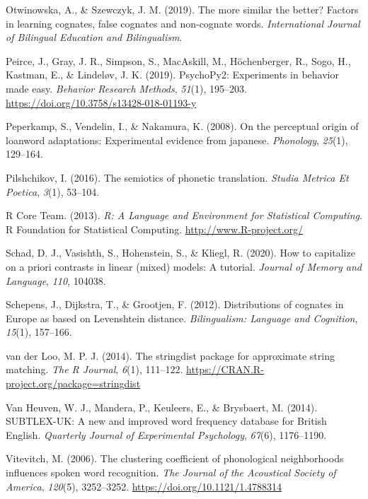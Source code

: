 \documentclass[
]{article}
\newlength{\cslhangindent}
\newenvironment{CSLReferences}[2] %
 {\begin{list}{}{%
  \setlength{\itemindent}{0pt}
  \setlength{\leftmargin}{0pt}
  \setlength{\parsep}{0pt}
  \ifodd #1
   \setlength{\leftmargin}{\cslhangindent}
   \setlength{\itemindent}{-1\cslhangindent}
  \fi
  \setlength{\itemsep}{#2\baselineskip}}}
 {\end{list}}
\begin{document}
\begin{CSLReferences}{1}{0}
Otwinowska, A., \& Szewczyk, J. M. (2019). The more similar the better?
Factors in learning cognates, false cognates and non-cognate words.
\emph{International Journal of Bilingual Education and Bilingualism}.

Peirce, J., Gray, J. R., Simpson, S., MacAskill, M., Höchenberger, R.,
Sogo, H., Kastman, E., \& Lindeløv, J. K. (2019). {PsychoPy2}:
{Experiments} in behavior made easy. \emph{Behavior Research Methods},
\emph{51}(1), 195--203. \url{https://doi.org/10.3758/s13428-018-01193-y}

Peperkamp, S., Vendelin, I., \& Nakamura, K. (2008). On the perceptual
origin of loanword adaptations: Experimental evidence from japanese.
\emph{Phonology}, \emph{25}(1), 129--164.

Pilshchikov, I. (2016). The semiotics of phonetic translation.
\emph{Studia Metrica Et Poetica}, \emph{3}(1), 53--104.

R Core Team. (2013). \emph{R: {A Language} and {Environment} for
{Statistical Computing}}. R Foundation for Statistical Computing.
\url{http://www.R-project.org/}

Schad, D. J., Vasishth, S., Hohenstein, S., \& Kliegl, R. (2020). How to
capitalize on a priori contrasts in linear (mixed) models: {A} tutorial.
\emph{Journal of Memory and Language}, \emph{110}, 104038.

Schepens, J., Dijkstra, T., \& Grootjen, F. (2012). Distributions of
cognates in {Europe} as based on {Levenshtein} distance.
\emph{Bilingualism: Language and Cognition}, \emph{15}(1), 157--166.

van der Loo, M. P. J. (2014). The stringdist package for approximate
string matching. \emph{The R Journal}, \emph{6}(1), 111--122.
\url{https://CRAN.R-project.org/package=stringdist}

Van Heuven, W. J., Mandera, P., Keuleers, E., \& Brysbaert, M. (2014).
{SUBTLEX-UK}: {A} new and improved word frequency database for {British
English}. \emph{Quarterly Journal of Experimental Psychology},
\emph{67}(6), 1176--1190.

Vitevitch, M. (2006). The clustering coefficient of phonological
neighborhoods influences spoken word recognition. \emph{The Journal of
the Acoustical Society of America}, \emph{120}(5), 3252--3252.
\url{https://doi.org/10.1121/1.4788314}


\end{CSLReferences}
\end{document}
